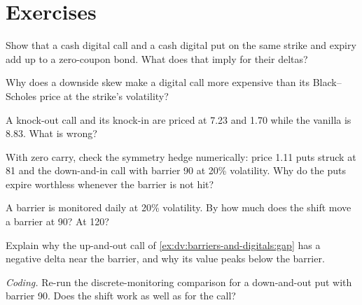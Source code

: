 \section{Exercises}

\begin{exercise}[$\star$]\label{exo:dv:barriers-and-digitals:1}
Show that a cash digital call and a cash digital put on the same strike and expiry add up to a zero-coupon bond. What
does that imply for their deltas?
\end{exercise}

\begin{exercise}[$\star$]\label{exo:dv:barriers-and-digitals:2}
Why does a downside skew make a digital call more expensive than its Black--Scholes price at the strike's volatility?
\end{exercise}

\begin{exercise}[$\star$]\label{exo:dv:barriers-and-digitals:3}
A knock-out call and its knock-in are priced at 7.23 and 1.70 while the vanilla is 8.83. What is wrong?
\end{exercise}

\begin{exercise}[$\star\star$]\label{exo:dv:barriers-and-digitals:4}
With zero carry, check the symmetry hedge numerically: price 1.11 puts struck at 81 and the down-and-in call with
barrier 90 at 20\% volatility. Why do the puts expire worthless whenever the barrier is not hit?
\end{exercise}

\begin{exercise}[$\star\star$]\label{exo:dv:barriers-and-digitals:5}
A barrier is monitored daily at 20\% volatility. By how much does the shift move a barrier at 90? At 120?
\end{exercise}

\begin{exercise}[$\star\star$]\label{exo:dv:barriers-and-digitals:6}
Explain why the up-and-out call of \cref{ex:dv:barriers-and-digitals:gap} has a negative delta near the barrier, and why
its value peaks below the barrier.
\end{exercise}

\begin{exercise}[$\star\star\star$]\label{exo:dv:barriers-and-digitals:7}
\emph{Coding.} Re-run the discrete-monitoring comparison for a down-and-out put with barrier 90. Does the shift work as
well as for the call?
\end{exercise}

